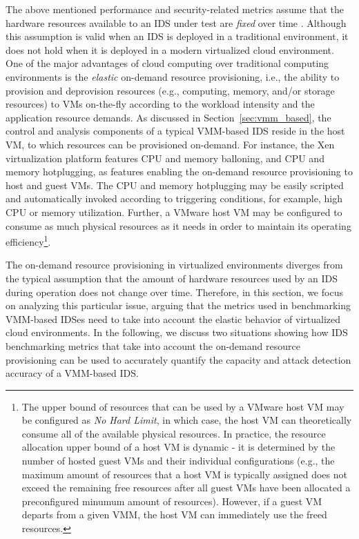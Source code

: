 The above mentioned performance and security-related metrics assume that the hardware resources available to an IDS under test are \emph{fixed} over time \cite{hall:capacity}. Although this assumption is valid when an IDS is deployed in a traditional environment, it does not hold when it is deployed in a modern virtualized cloud environment. One of the major advantages of cloud computing over traditional computing environments is the \emph{elastic} on-demand resource provisioning, i.e., the ability to provision and deprovision resources (e.g., computing, memory, and/or storage resources) to VMs on-the-fly according to the workload intensity and the application resource demands. As discussed in Section~\ref{sec:vmm_based}, the control and analysis components of a typical VMM-based IDS reside in the host VM, to which resources can be provisioned on-demand. For instance, the Xen virtualization platform features CPU and memory balloning, and CPU and memory hotplugging, as features enabling the on-demand resource provisioning to host and guest VMs. The CPU and memory hotplugging may be easily scripted and automatically invoked according to triggering conditions, for example, high CPU or memory utilization. Further, a VMware host VM may be configured to consume as much physical resources as it needs in order to maintain its operating efficiency\footnote{The upper bound of resources that can be used by a VMware host VM may be configured as \emph{No Hard Limit}, in which case, the host VM can theoretically consume all of the available physical resources. In practice, the resource allocation upper bound of a host VM is dynamic - it is determined by the number of hosted guest VMs and their individual configurations (e.g., the maximum amount of resources that a host VM is typically assigned does not exceed the remaining free resources after all guest VMs have been allocated a preconfigured minumum amount of resources). However, if a guest VM departs from a given VMM, the host VM can immediately use the freed resources.}.

The on-demand resource provisioning in virtualized environments diverges from the typical assumption that the amount of hardware resources used by an IDS during operation does not change over time. Therefore, in this section, we focus on analyzing this particular issue, arguing that the metrics used in benchmarking VMM-based IDSes need to take into account the elastic behavior of virtualized cloud environments. In the following, we discuss two situations showing how IDS benchmarking metrics that take into account the on-demand resource provisioning can be used to accurately quantify the capacity and attack detection accuracy of a VMM-based IDS. 

